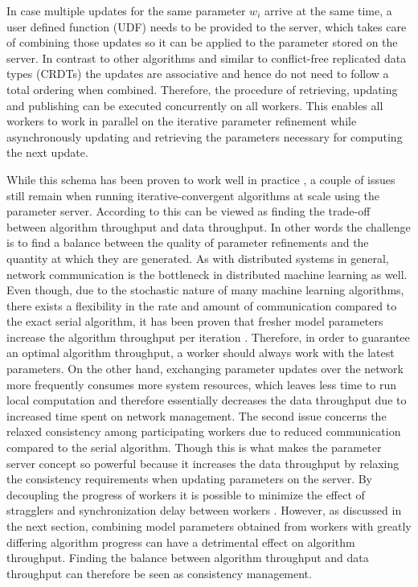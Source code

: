 In case multiple updates for the same parameter $w_i$ arrive at the same time, a user defined function (UDF) needs to be provided to the server, which takes care of combining those updates so it can be applied to the parameter stored on the server.
In contrast to other algorithms and similar to conflict-free replicated data types (CRDTs) the updates are associative and hence do not need to follow a total ordering when combined.
Therefore, the procedure of retrieving, updating and publishing can be executed concurrently on all workers.
This enables all workers to work in parallel on the iterative parameter refinement while asynchronously updating and retrieving the parameters necessary for computing the next update.

While this schema has been proven to work well in practice \cite{Li2014} \cite{dai2014high}, a couple of issues still remain when running iterative-convergent algorithms at scale using the parameter server.
According to \cite{wei2015managed} this can be viewed as finding the trade-off between algorithm throughput and data throughput.
In other words the challenge is to find a balance between the quality of parameter refinements and the quantity at which they are generated.
As with distributed systems in general, network communication is the bottleneck in distributed machine learning as well.
Even though, due to the stochastic nature of many machine learning algorithms, there exists a flexibility in the rate and amount of communication compared to the exact serial algorithm, it has been proven that fresher model parameters increase the algorithm throughput per iteration \cite{langford2009slow}.
Therefore, in order to guarantee an optimal algorithm throughput, a worker should always work with the latest parameters.
On the other hand, exchanging parameter updates over the network more frequently consumes more system resources, which leaves less time to run local computation and therefore essentially decreases the data throughput due to increased time spent on network management.
The second issue concerns the relaxed consistency among participating workers due to reduced communication compared to the serial algorithm.
Though this is what makes the parameter server concept so powerful because it increases the data throughput by relaxing the consistency requirements when updating parameters on the server.
By decoupling the progress of workers it is possible to minimize the effect of stragglers and synchronization delay between workers \cite{ananthanarayanan2013effective}.
However, as discussed in the next section, combining model parameters obtained from workers with greatly differing algorithm progress can have a detrimental effect on algorithm throughput.
Finding the balance between algorithm throughput and data throughput can therefore be seen as consistency management.


